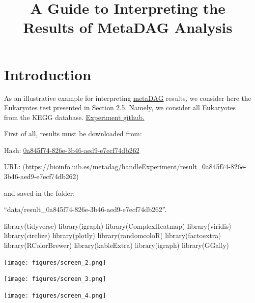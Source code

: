 \documentclass[
  letterpaper,
  DIV=11,
  numbers=noendperiod]{scrreprt}
\title{A Guide to Interpreting the Results of MetaDAG Analysis}
\author{}
\date{}
\newenvironment{Shaded}{}{}
\newcommand{\FunctionTok}[1]{\textcolor[rgb]{0.38,0.69,0.94}{#1}}
\newcommand{\NormalTok}[1]{\textcolor[rgb]{0.67,0.70,0.75}{#1}}
\renewcommand*\contentsname{Table of contents}
\newcommand\contentsname{Table of contents}
\begin{document}
\maketitle
\renewcommand*\contentsname{Table of contents}
{
\hypersetup{linkcolor=blue}
\setcounter{tocdepth}{2}
\tableofcontents
}

\hypertarget{introduction}{%
\chapter{Introduction}\label{introduction}}

As an illustrative example for interpreting
\href{https://bioinfo.uib.es/metadag/}{metaDAG} results, we consider
here the Eukaryotes test presented in Section 2.5. Namely, we consider
all Eukaryotes from the KEGG database.
\href{www.github.com/biocom-uib/metadag}{Experiment github.}

First of all, results must be downloaded from:

Hash:
\href{https://bioinfo.uib.es/metadag/handleExperiment/result_0a845f74-826e-3b46-aed9-e7ecf74db262}{0a845f74-826e-3b46-aed9-e7ecf74db262}

URL:
(https://bioinfo.uib.es/metadag/handleExperiment/result\_0a845f74-826e-3b46-aed9-e7ecf74db262)

and saved in the folder:

``data/result\_0a845f74-826e-3b46-aed9-e7ecf74db262''.

\begin{Shaded}
\begin{Highlighting}[]
\FunctionTok{library}\NormalTok{(tidyverse)}
\FunctionTok{library}\NormalTok{(igraph)}
\FunctionTok{library}\NormalTok{(ComplexHeatmap)}
\FunctionTok{library}\NormalTok{(viridis)}
\FunctionTok{library}\NormalTok{(circlize)}
\FunctionTok{library}\NormalTok{(plotly)}
\FunctionTok{library}\NormalTok{(randomcoloR)}
\FunctionTok{library}\NormalTok{(factoextra)}
\FunctionTok{library}\NormalTok{(RColorBrewer)}
\FunctionTok{library}\NormalTok{(kableExtra)}
\FunctionTok{library}\NormalTok{(igraph)}
\FunctionTok{library}\NormalTok{(GGally)}
\end{Highlighting}
\end{Shaded}

\texttt{[image: figures/screen\_2.png]}

\texttt{[image: figures/screen\_3.png]}

\texttt{[image: figures/screen\_4.png]}

\end{document}
